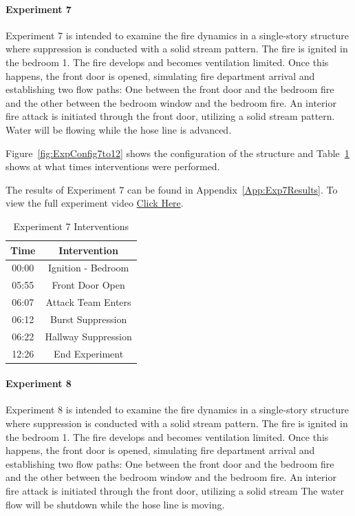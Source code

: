 \documentclass[12pt,oneside]{book}
\begin{document}
\clearpage

\paragraph{Experiment 7} \mbox{}

Experiment 7 is intended to examine the fire dynamics in a single-story structure where suppression is conducted with a solid stream pattern. The fire is ignited in the bedroom 1. The fire develops and becomes ventilation limited. Once this happens, the front door is opened, simulating fire department arrival and establishing two flow paths: One between the front door and the bedroom fire and the other between the bedroom window and the bedroom fire. An interior fire attack is initiated through the front door, utilizing a solid stream pattern. Water will be flowing while the hose line is advanced. 

Figure~\ref{fig:ExpConfig7to12} shows the configuration of the structure and Table~\ref{Table:Exp7Interventions} shows at what times interventions were performed. 

The results of Experiment 7 can be found in Appendix~\ref{App:Exp7Results}. To view the full experiment video \href{https://youtu.be/gl8rc1Nsl1k}{Click Here}.

\begin{table}[H]
	\centering
	\caption{Experiment 7 Interventions}
	\begin{tabular}{|c|c|} 
		\hline
		Time & Intervention \\ \hline \hline
		00:00 & Ignition - Bedroom \\ \hline
		05:55 & Front Door Open \\ \hline
		06:07 & Attack Team Enters\\ \hline
		06:12 & Burst Suppression \\ \hline 
		06:22 & Hallway Suppression \\ \hline
		12:26 & End Experiment\\ \hline
	\end{tabular}
	\label{Table:Exp7Interventions}
\end{table}

\clearpage

\paragraph{Experiment 8} \mbox{}

Experiment 8 is intended to examine the fire dynamics in a single-story structure where suppression is conducted with a solid stream pattern. The fire is ignited in the bedroom 1. The fire develops and becomes ventilation limited. Once this happens, the front door is opened, simulating fire department arrival and establishing two flow paths: One between the front door and the bedroom fire and the other between the bedroom window and the bedroom fire. An interior fire attack is initiated through the front door, utilizing a solid stream The water flow will be shutdown while the hose line is moving. 
\end{document}
